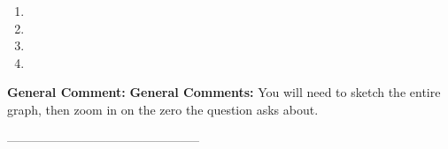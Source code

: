 \documentclass{extbook}[14pt]
\begin{document}
\begin{enumerate}[label=\Alph*.] 
\item   
\item   
\item   
\item   
\end{enumerate} 
 
\textbf{General Comment:} \textbf{General Comments:} You will need to sketch the entire graph, then zoom in on the zero the question asks about. 

-----------------------------------------------
\end{document}
